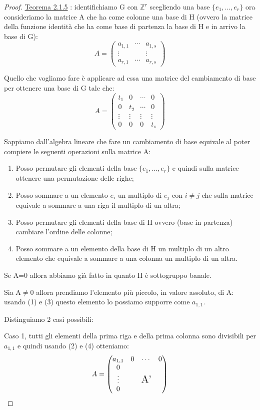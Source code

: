 \documentclass[11pt, a4paper, twoside]{article}
\begin{document}
\begin{proof}\hyperref[Teorema 2.1.5]{Teorema 2.1.5}
	: identifichiamo G con $\mathbb{Z}^r$ scegliendo una base $\{e_1,\dots,e_r\}$ ora consideriamo la matrice A che ha come colonne una base di H (ovvero la matrice della funzione identità che ha come base di partenza la base di H e in arrivo la base di G):
	\[
		A=\begin{pmatrix}a_{1,1}&\cdots&a_{1,s}\\ \vdots& &\vdots\\a_{r,1}&\cdots& a_{r,s}\end{pmatrix}
	\]

	Quello che vogliamo fare è applicare ad essa una matrice del cambiamento di base per ottenere una base di G tale che: 
	\[
		A=\begin{pmatrix}t_1&0&\cdots&0\\ 
					  0&t_2 &\cdots&0\\ 
					  \vdots&\vdots&\vdots& \vdots\\ 
		     			  0& 0&0 & t_s 
		     \end{pmatrix}
	\]

	Sappiamo dall'algebra lineare che fare un cambiamento di base equivale al poter compiere le seguenti operazioni sulla matrice A:
	\begin{enumerate}
		\item Posso permutare gli elementi della base $\{e_1,\dots,e_r\}$ e quindi sulla matrice ottenere una permutazione delle righe;
		\item Posso sommare a un elemento $e_i$ un multiplo di $e_j$ con $i\neq j$ che sulla matrice equivale a sommare a una riga il multiplo di un altra;
		\item Posso permutare gli elementi della base di H ovvero (base in partenza) cambiare l'ordine delle colonne;
		\item Posso sommare a un elemento della base di H un multiplo di un altro elemento che equivale a sommare a una colonna un multiplo di un altra. 
	\end{enumerate}

	Se A=0 allora abbiamo già fatto in quanto H è sottogruppo banale. 
	
	Sia A$\neq$0 allora prendiamo l'elemento più piccolo, in valore assoluto, di A: usando (1) e (3) questo elemento lo possiamo supporre come $a_{1,1}$. 

	Distinguiamo 2 casi possibili:

	Caso 1, tutti gli elementi della prima riga e della prima colonna sono divisibili per $a_{1,1}$ e quindi usando (2) e (4) otteniamo:
	\[
		A=\begin{pmatrix}a_{1,1}&0&\cdots&0\\ 0& & &\\ \vdots& &\Large\text{A'}&\\0& & & \end{pmatrix}
	\]


\end{proof}
\end{document}
